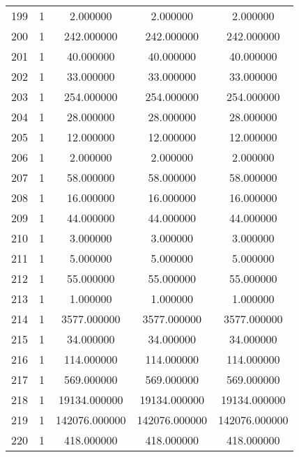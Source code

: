 \documentclass[a4paper,12pt]{article}
\begin{document}
\begin{center}
\begin{longtable}{l S[table-format=3.0] S[table-format=8.2] S[table-format=8.2] S[table-format=8.2]}
        199   &   1   &     2.000000   &      2.000000     &       2.000000 \\
        200   &   1   &   242.000000   &    242.000000     &     242.000000 \\
        201   &   1   &    40.000000   &     40.000000     &      40.000000 \\
        202   &   1   &    33.000000   &     33.000000     &      33.000000 \\
        203   &   1   &   254.000000   &    254.000000     &     254.000000 \\
        204   &   1   &    28.000000   &     28.000000     &      28.000000 \\
        205   &   1   &    12.000000   &     12.000000     &      12.000000 \\
        206   &   1   &     2.000000   &      2.000000     &       2.000000 \\
        207   &   1   &    58.000000   &     58.000000     &      58.000000 \\
        208   &   1   &    16.000000   &     16.000000     &      16.000000 \\
        209   &   1   &    44.000000   &     44.000000     &      44.000000 \\
        210   &   1   &     3.000000   &      3.000000     &       3.000000 \\
        211   &   1   &     5.000000   &      5.000000     &       5.000000 \\
        212   &   1   &    55.000000   &     55.000000     &      55.000000 \\
        213   &   1   &     1.000000   &      1.000000     &       1.000000 \\
        214   &   1   &  3577.000000   &   3577.000000     &    3577.000000 \\
        215   &   1   &    34.000000   &     34.000000     &      34.000000 \\
        216   &   1   &   114.000000   &    114.000000     &     114.000000 \\
        217   &   1   &   569.000000   &    569.000000     &     569.000000 \\
        218   &   1   & 19134.000000   &   19134.000000     &   19134.000000 \\
        219   &   1   & 142076.000000  &  142076.000000     &  142076.000000 \\
        220   &   1   &   418.000000   &    418.000000     &     418.000000 \\

\end{longtable}
\end{center}
\end{document}
